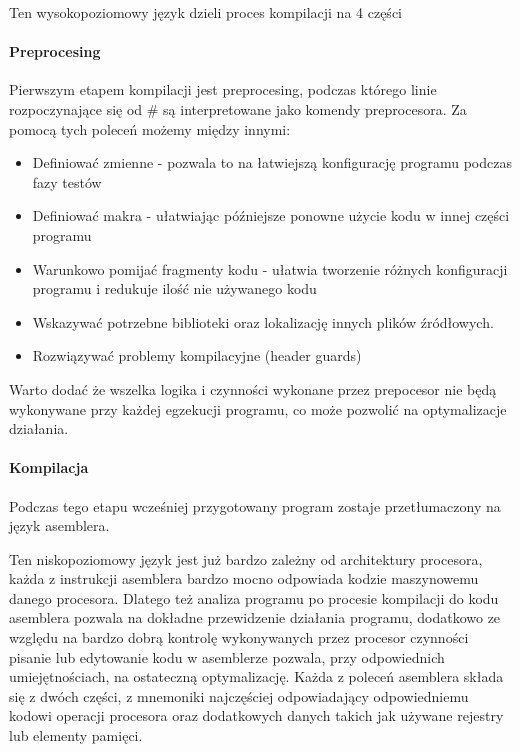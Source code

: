Ten wysokopoziomowy język dzieli proces kompilacji na 4 części

\paragraph{Preprocesing}

Pierwszym etapem kompilacji jest preprocesing, podczas którego linie rozpoczynające się od \# są interpretowane jako komendy preprocesora.  
Za pomocą tych poleceń możemy między innymi:
\begin{itemize}
        \item Definiować zmienne - pozwala to na łatwiejszą konfigurację programu podczas fazy testów
        \item Definiować makra - ułatwiając późniejsze ponowne użycie kodu w innej części programu
        \item Warunkowo pomijać fragmenty kodu - ułatwia tworzenie różnych konfiguracji programu i redukuje ilość nie używanego kodu
        \item Wskazywać potrzebne biblioteki oraz lokalizację innych plików źródłowych.
        \item Rozwiązywać problemy kompilacyjne (header guards)
\end{itemize}
Warto dodać że wszelka logika i czynności wykonane przez prepocesor nie będą wykonywane przy każdej egzekucji programu, co może pozwolić na optymalizacje działania. 

\paragraph{Kompilacja}

Podczas tego etapu wcześniej przygotowany program zostaje przetłumaczony na język asemblera. 

Ten niskopoziomowy język jest już bardzo zależny od architektury procesora, każda z  instrukcji asemblera bardzo mocno odpowiada kodzie maszynowemu danego procesora. 
Dlatego też analiza programu po procesie kompilacji do kodu asemblera pozwala na dokładne przewidzenie działania programu, dodatkowo
ze względu na bardzo dobrą kontrolę wykonywanych przez procesor czynności pisanie lub edytowanie kodu w asemblerze pozwala, przy odpowiednich umiejętnościach, na ostateczną optymalizację. 
Każda z poleceń asemblera składa się z dwóch części, z mnemoniki najczęściej odpowiadający odpowiedniemu kodowi operacji procesora oraz dodatkowych danych takich jak używane rejestry lub elementy pamięci. 

